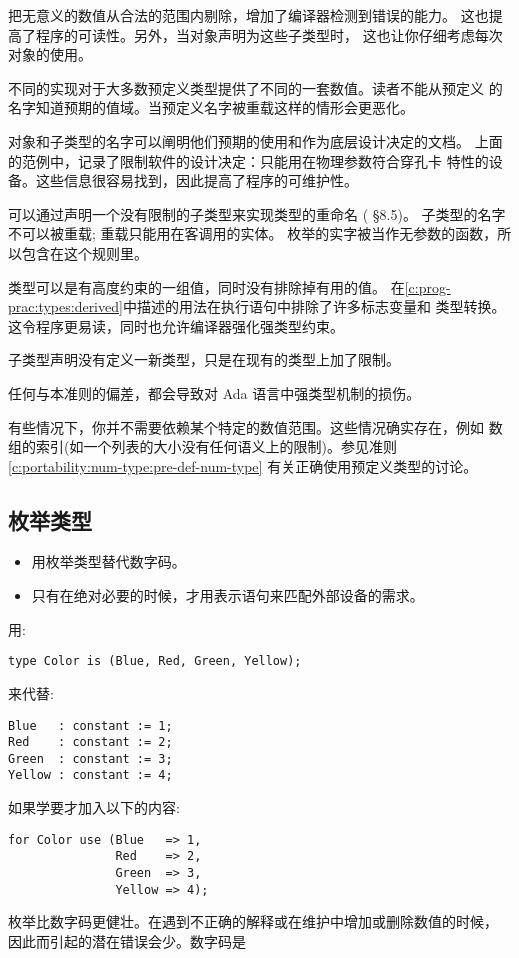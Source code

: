 \begin{blockindent}
把无意义的数值从合法的范围内剔除，增加了编译器检测到错误的能力。
这也提高了程序的可读性。另外，当对象声明为这些子类型时，
这也让你仔细考虑每次对象的使用。

不同的实现对于大多数预定义类型提供了不同的一套数值。读者不能从预定义
的名字知道预期的值域。当预定义名字被重载这样的情形会更恶化。

对象和子类型的名字可以阐明他们预期的使用和作为底层设计决定的文档。
上面的范例中，记录了限制软件的设计决定：只能用在物理参数符合穿孔卡
特性的设备。这些信息很容易找到，因此提高了程序的可维护性。

可以通过声明一个没有限制的子类型来实现类型的重命名 (\cite{arm95} \S{}8.5)。
子类型的名字不可以被重载; 重载只能用在客调用的实体。
枚举的实字被当作无参数的函数，所以包含在这个规则里。

类型可以是有高度约束的一组值，同时没有排除掉有用的值。
在\ref{c:prog-prac:types:derived}中描述的用法在执行语句中排除了许多标志变量和
类型转换。这令程序更易读，同时也允许编译器强化强类型约束。
\end{blockindent}

\begin{blockindent}
子类型声明没有定义一新类型，只是在现有的类型上加了限制。

任何与本准则的偏差，都会导致对 Ada 语言中强类型机制的损伤。
\end{blockindent}


\begin{blockindent}
有些情况下，你并不需要依赖某个特定的数值范围。这些情况确实存在，例如
数组的索引(如一个列表的大小没有任何语义上的限制)。参见准则
\ref{c:portability:num-type:pre-def-num-type} 有关正确使用预定义类型的讨论。
\end{blockindent}

\subsection{枚举类型}
\begin{itemize}
\item 用枚举类型替代数字码。
\item 只有在绝对必要的时候，才用表示语句来匹配外部设备的需求。
\end{itemize}

\begin{blockindent}
用:
\begin{lstlisting}
type Color is (Blue, Red, Green, Yellow);
\end{lstlisting}
来代替:
\begin{lstlisting}
Blue   : constant := 1;
Red    : constant := 2;
Green  : constant := 3;
Yellow : constant := 4;
\end{lstlisting}
如果学要才加入以下的内容:
\begin{lstlisting}
for Color use (Blue   => 1,
               Red    => 2,
               Green  => 3,
               Yellow => 4);
\end{lstlisting}
\end{blockindent}

\begin{blockindent}
枚举比数字码更健壮。在遇到不正确的解释或在维护中增加或删除数值的时候，
因此而引起的潜在错误会少。数字码是
\end{blockindent}
